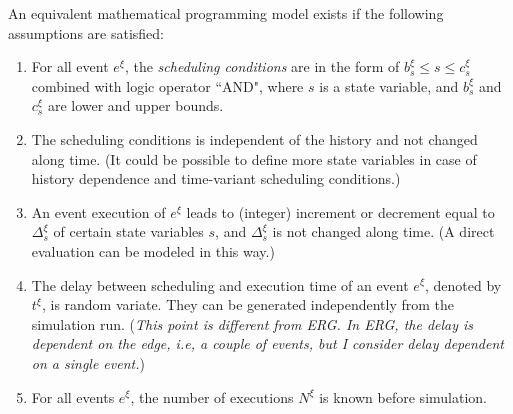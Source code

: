 \documentclass[]{interact}
\theoremstyle{plain}%
\theoremstyle{definition}
\theoremstyle{remark}
\begin{document}
An equivalent mathematical programming model exists if the following assumptions are satisfied:
\begin{enumerate}
	\item For all event $e^{\xi}$, the \textit{scheduling conditions} are in the form of $b^{\xi}_s\le s \le c^{\xi}_s$ combined with logic operator ``AND", where $s$ is a state variable, and $b^{\xi}_s$ and $c^{\xi}_s$ are lower and upper bounds.
	\item The scheduling conditions is independent of the history and not changed along time. (It could be possible to define more state variables in case of history dependence and time-variant scheduling conditions.)
	\item An event execution of $e^{\xi}$ leads to (integer) increment or decrement equal to $\Delta^{\xi}_s$ of certain state variables $s$, and $\Delta^{\xi}_s$ is not changed along time. (A direct evaluation can be modeled in this way.)
	\item The delay between scheduling and execution time of an event $e^{\xi}$, denoted by $t^{\xi}$, is random variate. They can be generated independently from the simulation run. (\textit{This point is different from ERG. In ERG, the delay is dependent on the edge, i.e, a couple of events, but I consider delay dependent on a single event.})
	\item For all events $e^{\xi}$, the number of executions $N^{\xi}$ is known before simulation.
\end{enumerate}
\end{document}
